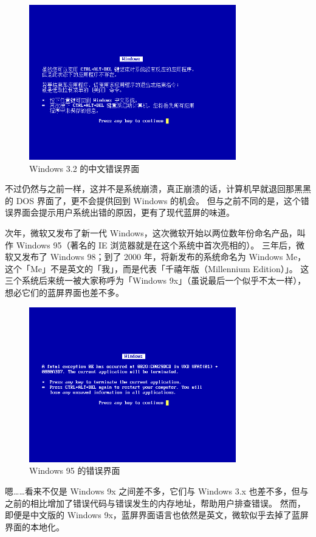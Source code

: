\begin{figure}[htb!]
  \centering
  \includegraphics[width=9cm]{assets/Win-3.2-Error.png}
  \caption{Windows 3.2 的中文错误界面}
  \label{Win-3.2-Error}
\end{figure}

不过仍然与之前一样，这并不是系统崩溃，真正崩溃的话，计算机早就退回那黑黑的 DOS 界面了，更不会提供回到 Windows 的机会。
但与之前不同的是，这个错误界面会提示用户系统出错的原因，更有了现代蓝屏的味道。

次年，微软又发布了新一代 Windows，这次微软开始以两位数年份命名产品，叫作 Windows 95（著名的 IE 浏览器就是在这个系统中首次亮相的）。
三年后，微软又发布了 Windows 98；到了 2000 年，将新发布的系统命名为 Windows Me，这个「Me」不是英文的「我」，而是代表「千禧年版（Millennium Edition）」。
这三个系统后来统一被大家称呼为「Windows 9x」（虽说最后一个似乎不太一样），想必它们的蓝屏界面也差不多。

\begin{figure}[htb!]
  \centering
  \includegraphics[width=9cm]{assets/Win-95-Error.png}
  \caption{Windows 95 的错误界面}
  \label{Win-95-Error}
\end{figure}

嗯……看来不仅是 Windows 9x 之间差不多，它们与 Windows 3.x 也差不多，但与之前的相比增加了错误代码与错误发生的内存地址，帮助用户排查错误。
然而，即便是中文版的 Windows 9x，蓝屏界面语言也依然是英文，微软似乎去掉了蓝屏界面的本地化。

